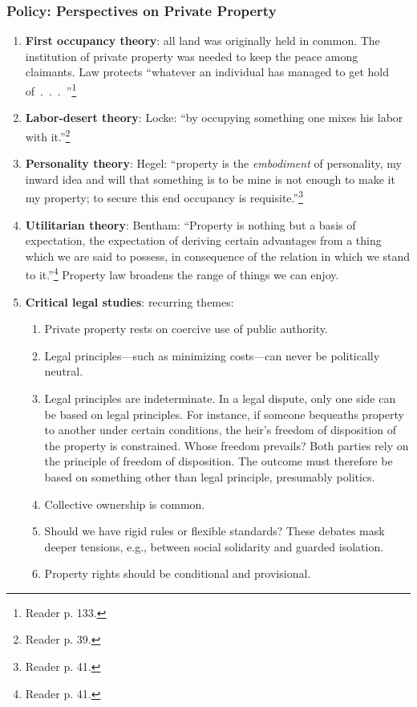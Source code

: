 \subsubsection{Policy: Perspectives on Private Property}

\begin{enumerate}
    \item \textbf{First occupancy theory}: all land was originally held in 
    common. The institution of private property was needed to keep the peace 
    among claimants. Law protects ``whatever an individual has managed to get 
    hold of~.~.~.~''\footnote{Reader p. 133.}
    \item \textbf{Labor-desert theory}: Locke: ``by occupying something one 
    mixes his labor with it.''\footnote{Reader p. 39.}
    \item \textbf{Personality theory}: Hegel: ``property is the 
    \emph{embodiment} of personality, my inward idea and will that something 
    is to be mine is not enough to make it my property; to secure this end 
    occupancy is requisite.''\footnote{Reader p. 41.}
    \item \textbf{Utilitarian theory}: Bentham: ``Property is nothing but a 
    basis of expectation, the expectation of deriving certain advantages from 
    a thing which we are said to possess, in consequence of the relation in 
    which we stand to it.''\footnote{Reader p. 41.} Property law broadens the 
    range of things we can enjoy.
    \item \textbf{Critical legal studies}: recurring themes:
    \begin{enumerate}
        \item Private property rests on coercive use of public authority.
        \item Legal principles---such as minimizing costs---can never be 
        politically neutral.
        \item Legal principles are indeterminate. In a legal dispute, only one 
        side can be based on legal principles. For instance, if someone 
        bequeaths property to another under certain conditions, the heir's 
        freedom of disposition of the property is constrained. Whose freedom 
        prevails? Both parties rely on the principle of freedom of 
        disposition. The outcome must therefore be based on something other 
        than legal principle, presumably politics.
        \item Collective ownership is common.
        \item Should we have rigid rules or flexible standards? These debates 
        mask deeper tensions, e.g., between social solidarity and guarded 
        isolation.
        \item Property rights should be conditional and provisional.
    \end{enumerate}
\end{enumerate}
